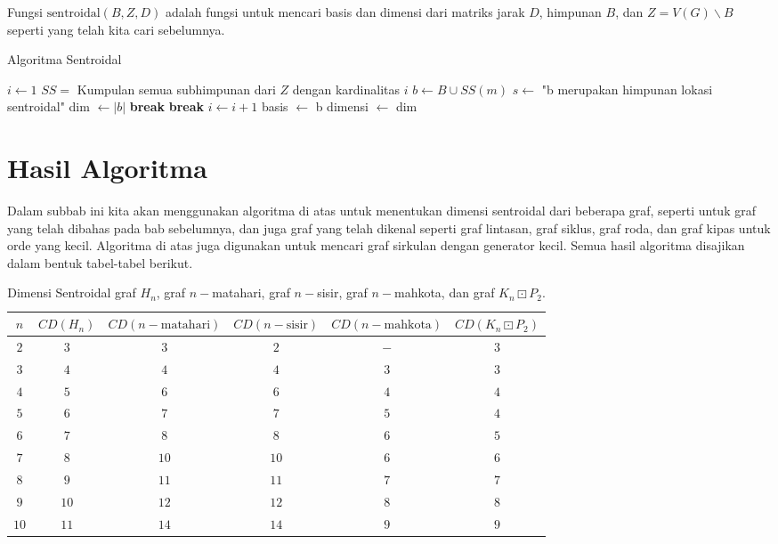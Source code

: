 Fungsi $\text{sentroidal}(B,Z,D)$ adalah fungsi untuk mencari basis dan dimensi dari matriks jarak $D$, himpunan $B$, dan $Z=V(G)\backslash B$ seperti yang telah kita cari sebelumnya.
\begin{algorithm}
	\caption{Algoritma Sentroidal}
	\begin{algorithmic}[1]
		\State $i\gets 1$
		\State $SS=$ Kumpulan semua subhimpunan dari $Z$ dengan kardinalitas $i$
		\State $b\gets B\cup SS(m)$
		\State $s \gets$ "b merupakan himpunan lokasi sentroidal"
		\State dim $\gets|b|$
		\State \textbf{break}
		\EndIf
		\EndFor
		\State \textbf{break}
		\Else
		\State $i\gets i+1$
		\EndIf
		\EndWhile
		\State basis $\gets$ b
		\State dimensi $\gets$ dim
		\EndProcedure
	\end{algorithmic}
\end{algorithm}

\newpage
\section{Hasil Algoritma}
Dalam subbab ini kita akan menggunakan algoritma di atas untuk menentukan dimensi sentroidal dari beberapa graf, seperti untuk graf yang telah dibahas pada bab sebelumnya, dan juga graf yang telah dikenal seperti graf lintasan, graf siklus, graf roda, dan graf kipas untuk orde yang kecil. Algoritma di atas juga digunakan untuk mencari graf sirkulan dengan generator kecil. Semua hasil algoritma disajikan dalam bentuk tabel-tabel berikut.

\begin{table}[h!]\label{tabel1}
	\centering
	\begin{tabular}{|c|c|c|c|c|c|}
		\hline
		$n$&$CD(H_n)$&$CD(n-\text{matahari})$&$CD(n-\text{sisir})$&$CD(n-\text{mahkota})$&$CD(K_n\boxdot P_2)$\\
		\hline
		\textbf{$2$}&$3$&$3$&$2$&$-$&$3$\\
		\textbf{$3$}&$4$&$4$&$4$&$3$&$3$\\
		\textbf{$4$}&$5$&$6$&$6$&$4$&$4$\\
		\textbf{$5$}&$6$&$7$&$7$&$5$&$4$\\
		\textbf{$6$}&$7$&$8$&$8$&$6$&$5$\\
		\textbf{$7$}&$8$&$10$&$10$&$6$&$6$\\
		\textbf{$8$}&$9$&$11$&$11$&$7$&$7$\\
		\textbf{$9$}&$10$&$12$&$12$&$8$&$8$\\
		\textbf{$10$}&$11$&$14$&$14$&$9$&$9$\\
		\hline
	\end{tabular}
	\caption{Dimensi Sentroidal graf $H_n$, graf $n-$matahari, graf $n-$sisir, graf $n-$mahkota, dan graf $K_n\boxdot P_2$.}
\end{table}

